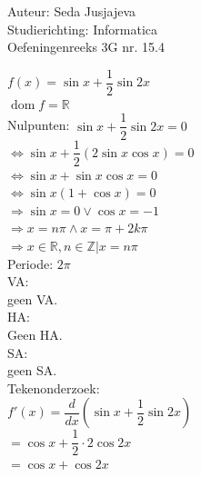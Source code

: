 \documentclass[a4paper]{article}
\begin{document}
\noindent \large Auteur: Seda Jusjajeva\\
\noindent \large Studierichting: Informatica\\
\noindent \large Oefeningenreeks 3G nr. 15.4 \\

\medskip

\normalsize


$f(x) = \sin x + \dfrac{1}{2}\sin 2x$ \\

$\operatorname{dom}f = \mathbb{R}$ \\

Nulpunten: $\sin x + \dfrac{1}{2}\sin 2x = 0$ \\

$\Leftrightarrow \sin x + \dfrac{1}{2}(2\sin x\cos x) = 0$ \\

$\Leftrightarrow \sin x + \sin x\cos x = 0$ \\

$\Leftrightarrow\sin x(1+\cos x) = 0$ \\

$\Rightarrow \sin x = 0 \vee \cos x = -1$ \\

$\Rightarrow x = n\pi \wedge x = \pi + 2k\pi$ \\

$\Rightarrow {x \in \mathbb{R}, n \in \mathbb{Z} | x = n\pi}$\\

Periode: $2\pi$ \\

VA: \\

geen VA. \\

HA: \\

Geen HA. \\

SA: \\

geen SA. \\

Tekenonderzoek: \\

$f'(x) = \dfrac{d}{dx}\left(\sin x + \dfrac{1}{2}\sin 2x\right)$ \\

$= \cos x + \dfrac{1}{2}\cdot 2\cos 2x$ \\

$= \cos x + \cos 2x$ \\
\end{document}
